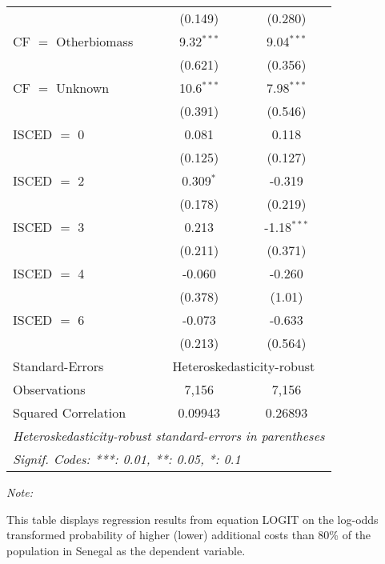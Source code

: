 \begin{table}[htbp!]
\begin{adjustbox}{width = 1\textwidth, max height = 0.95\textheight, center}
\begin{threeparttable}[b]
\begin{tabular}{lcc}
                                 & (0.149)       & (0.280)\\   
            CF $=$ Otherbiomass  & 9.32$^{***}$  & 9.04$^{***}$\\   
                                 & (0.621)       & (0.356)\\   
            CF $=$ Unknown       & 10.6$^{***}$  & 7.98$^{***}$\\   
                                 & (0.391)       & (0.546)\\   
            ISCED $=$ 0          & 0.081         & 0.118\\   
                                 & (0.125)       & (0.127)\\   
            ISCED $=$ 2          & 0.309$^{*}$   & -0.319\\   
                                 & (0.178)       & (0.219)\\   
            ISCED $=$ 3          & 0.213         & -1.18$^{***}$\\   
                                 & (0.211)       & (0.371)\\   
            ISCED $=$ 4          & -0.060        & -0.260\\   
                                 & (0.378)       & (1.01)\\   
            ISCED $=$ 6          & -0.073        & -0.633\\   
                                 & (0.213)       & (0.564)\\   
            \midrule 
            Standard-Errors & \multicolumn{2}{c}{Heteroskedasticity-robust} \\ 
            Observations         & 7,156         & 7,156\\  
            Squared Correlation  & 0.09943       & 0.26893\\  
            \midrule \midrule
            \multicolumn{3}{l}{\emph{Heteroskedasticity-robust standard-errors in parentheses}}\\
            \multicolumn{3}{l}{\emph{Signif. Codes: ***: 0.01, **: 0.05, *: 0.1}}\\
         \end{tabular}
         
         \begin{tablenotes}\item \medskip \textit{Note:}
            \item This table displays regression results from equation LOGIT on the log-odds transformed probability of higher (lower) additional costs than 80\% of the population in Senegal as the dependent variable. 
         \end{tablenotes}
      \end{threeparttable}
   \end{adjustbox}
\end{table}


